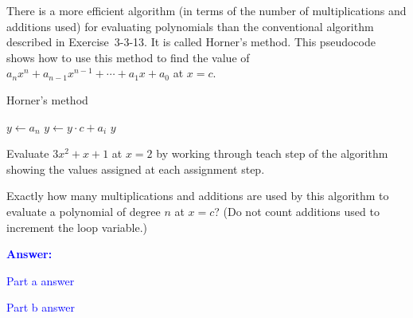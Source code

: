 \item{}
There is a more efficient algorithm (in terms of the number of multiplications
and additions used) for evaluating polynomials than the conventional algorithm
described in Exercise~3-3-13. It is called Horner's method. This pseudocode
shows how to use this method to find the value of $a_nx^n+a_{n-1}x^{n-1}+\cdots
+a_1x+a_0$ at $x=c$.
\begin{algorithm}[H]
    \caption{Horner's method}
    \begin{algorithmic}[1]
            \State $y\gets a_n$
            \Statex
                \State $y\gets y\cdot c+a_i$
            \EndFor
            \Statex
            $y$
        \EndProcedure
    \end{algorithmic}
\end{algorithm}
\begin{list}{\textbf{.}}{}
\item Evaluate $3x^2+x+1$ at $x=2$ by working through teach step of the
    algorithm showing the values assigned at each assignment step.
\item Exactly how many multiplications and additions are used by this algorithm
    to evaluate a polynomial of degree $n$ at $x=c$? (Do not count additions
    used to increment the loop variable.)
\end{list}
\vskip12pt
\ifanswers
\textcolor{blue}{
\textbf{Answer:}\\[6pt]
\begin{list}{\textbf{.}}{}
\item Part a answer
\item Part b answer
\end{list}
}
\newpage
\fi
